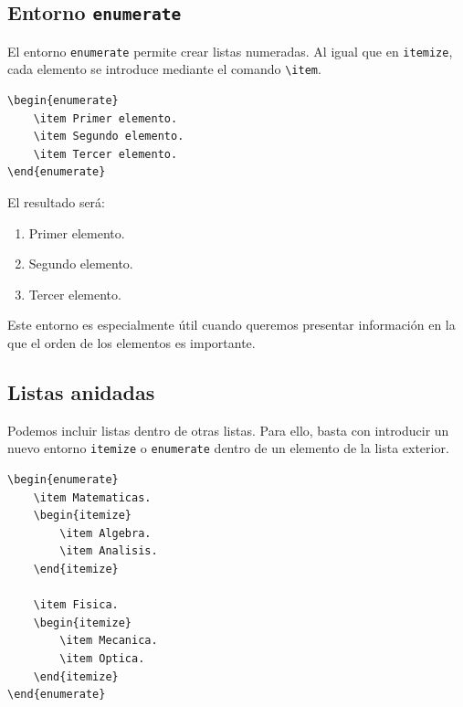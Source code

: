 \documentclass[11pt,a4paper]{article}
\theoremstyle{plain}
\theoremstyle{definition}
\theoremstyle{remark}
\theoremstyle{exercise}
\begin{document}
\subsection{Entorno \texttt{enumerate}}

El entorno \verb|enumerate| permite crear listas numeradas. Al igual que en \verb|itemize|, cada elemento se introduce mediante el comando \verb|\item|.

\begin{lstlisting}
\begin{enumerate}
    \item Primer elemento.
    \item Segundo elemento.
    \item Tercer elemento.
\end{enumerate}
\end{lstlisting}

\noindent El resultado será:

\begin{paginarecuadrada}
\begin{enumerate}
    \item Primer elemento.
    \item Segundo elemento.
    \item Tercer elemento.
\end{enumerate}
\end{paginarecuadrada}

\medskip

\noindent Este entorno es especialmente útil cuando queremos presentar información en la que el orden de los elementos es importante.

\subsection{Listas anidadas}

Podemos incluir listas dentro de otras listas. Para ello, basta con introducir un nuevo entorno \verb|itemize| o \verb|enumerate| dentro de un elemento de la lista exterior.

\begin{lstlisting}
\begin{enumerate}
    \item Matematicas.
    \begin{itemize}
        \item Algebra.
        \item Analisis.
    \end{itemize}

    \item Fisica.
    \begin{itemize}
        \item Mecanica.
        \item Optica.
    \end{itemize}
\end{enumerate}
\end{lstlisting}
\end{document}
